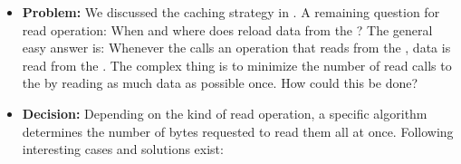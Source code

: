 \begin{itemize}
	\item \textbf{Problem:} We discussed the caching strategy in . A remaining question for read operation: When and where does \LibName{} reload data from the \TERMmedium{}? The general easy answer is: Whenever the \ACTORuser{} calls an operation that reads from the \TERMmedium{}, data is read from the \TERMmedium{}. The complex thing is to minimize the number of read calls to the \TERMmedium{} by reading as much data as possible once. How could this be done?
	\item \textbf{Decision:} Depending on the kind of read operation, a specific algorithm determines the number of bytes requested to read them all at once. Following interesting cases and solutions exist:
	

\end{itemize}
